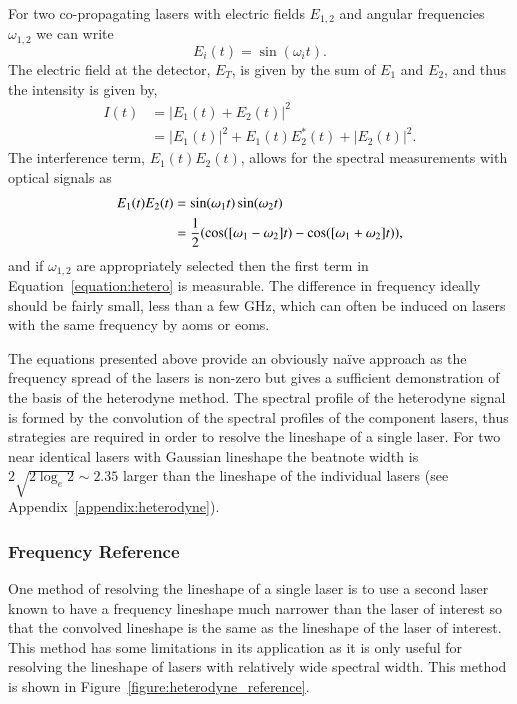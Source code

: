 For two co-propagating lasers with electric fields $E_{1, 2}$ and angular frequencies $\omega_{1, 2}$ we can write
\begin{equation}
E_{i}(t) = \sin(\omega_{i}t).
\end{equation}
The electric field at the detector, $E_T$, is given by the sum of $E_{1}$ and $E_{2}$, and thus the intensity is given by,
\begin{align}
I(t) &= |E_1(t) + E_2(t)|^2\nonumber\\
&= |E_1(t)|^2 + E_1(t)E_2^*(t) + |E_2(t)|^2.
\end{align}
The interference term, $E_1(t)E_2(t)$, allows for the spectral measurements with optical signals as
\begin{align}
E_1(t)E_2(t) &= \sin(\omega_1 t) \sin(\omega_2 t) \notag \\
&= \frac{1}{2} (\cos([\omega_1-\omega_2]t) - \cos([\omega_1+\omega_2]t)), \label{equation:hetero}
\end{align}
and if $\omega_{1,2}$ are appropriately selected then the first term in Equation~\ref{equation:hetero} is measurable.
The difference in frequency ideally should be fairly small, less than a few GHz, which can often be induced on lasers with the same frequency by \glspl{aom} or \glspl{eom}.

The equations presented above provide an obviously na\"ive approach as the frequency spread of the lasers is non-zero but gives a sufficient demonstration of the basis of the heterodyne method.
The spectral profile of the heterodyne signal is formed by the convolution of the spectral profiles of the component lasers, thus strategies are required in order to resolve the lineshape of a single laser.
For two near identical lasers with Gaussian lineshape the beatnote width is $2\sqrt{2\log_e2}\sim2.35$ larger than the lineshape of the individual lasers (see Appendix~\ref{appendix:heterodyne}).

\subsubsection{Frequency Reference}
One method of resolving the lineshape of a single laser is to use a second laser known to have a frequency lineshape much narrower than the laser of interest so that the convolved lineshape is the same as the lineshape of the laser of interest.
This method has some limitations in its application as it is only useful for resolving the lineshape of lasers with relatively wide spectral width.
This method is shown in Figure~\ref{figure:heterodyne_reference}.


